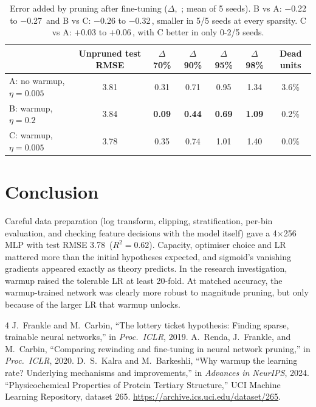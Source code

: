 \documentclass[10pt,a4paper]{article}
\newcommand{\A}{\,\text{\AA}}
\begin{document}
\begin{table}[H]
\centering\small
\begin{tabular}{@{}lcccccc@{}}
\toprule
& Unpruned test RMSE & $\Delta$ 70\% & $\Delta$ 90\% & $\Delta$ 95\% & $\Delta$ 98\% & Dead units \\
\midrule
A: no warmup, $\eta=0.005$ & 3.81 & 0.31 & 0.71 & 0.95 & 1.34 & 3.6\% \\
B: warmup, $\eta=0.2$ & 3.84 & \textbf{0.09} & \textbf{0.44} & \textbf{0.69} & \textbf{1.09} & 0.2\% \\
C: warmup, $\eta=0.005$ & 3.78 & 0.35 & 0.74 & 1.01 & 1.40 & 0.0\% \\
\bottomrule
\end{tabular}
\caption{Error added by pruning after fine-tuning ($\Delta$, \A; mean of 5 seeds). B vs A: $-$0.22 to $-$0.27\A{} and
B vs C: $-$0.26 to $-$0.32\A, smaller in 5/5 seeds at every sparsity. C vs A: $+$0.03 to $+$0.06\A{}, with C better in only 0-2/5 seeds.}
\label{tab:prune}
\end{table}

\section{Conclusion}
Careful data preparation (log transform, clipping, stratification, per-bin evaluation, and checking feature
decisions with the model itself) gave a 4$\times$256 MLP with test RMSE 3.78\A{} ($R^2=0.62$). Capacity, optimiser
choice and LR mattered more than the initial hypotheses expected, and sigmoid's vanishing gradients appeared exactly as
theory predicts. In the research investigation, warmup raised the tolerable LR at least 20-fold. At matched accuracy,
the warmup-trained network was clearly more robust to magnitude pruning, but only because of the larger LR that
warmup unlocks.

\begin{thebibliography}{4}\footnotesize\setlength{\itemsep}{0pt}
 J.~Frankle and M.~Carbin, ``The lottery ticket hypothesis: Finding sparse, trainable neural networks,'' in \emph{Proc.\ ICLR}, 2019.
 A.~Renda, J.~Frankle, and M.~Carbin, ``Comparing rewinding and fine-tuning in neural network pruning,'' in \emph{Proc.\ ICLR}, 2020.
 D.~S.~Kalra and M.~Barkeshli, ``Why warmup the learning rate? Underlying mechanisms and improvements,'' in \emph{Advances in NeurIPS}, 2024.
 ``Physicochemical Properties of Protein Tertiary Structure,'' UCI Machine Learning Repository, dataset 265. \url{https://archive.ics.uci.edu/dataset/265}.
\end{thebibliography}
\end{document}
